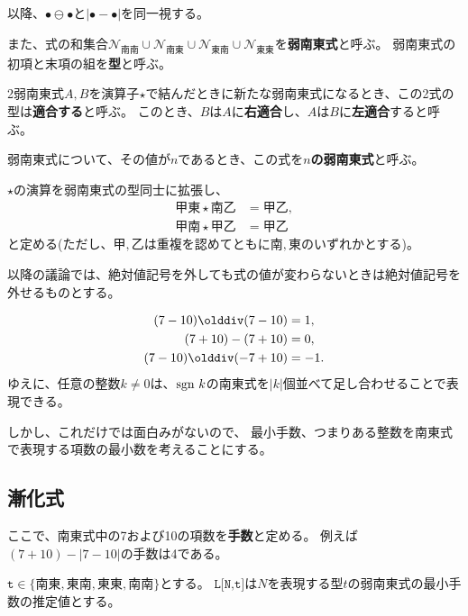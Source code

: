\documentclass[10pt,dvipdfmx]{ujarticle}
\newcommand{\nantoset}{\mathcal{N}}
\begin{document}
以降、$\bullet\ominus\bullet$と$|\bullet-\bullet|$を同一視する。

また、式の和集合$\nantoset_{南南}\cup\nantoset_{南東}\cup\nantoset_{東南}\cup\nantoset_{東東}$を\textbf{弱南東式}と呼ぶ。
弱南東式の初項と末項の組を\textbf{型}と呼ぶ。

2弱南東式$A,B$を演算子$\star$で結んだときに新たな弱南東式になるとき、この2式の型は\textbf{適合する}と呼ぶ。
このとき、$B$は$A$に\textbf{右適合}し、$A$は$B$に\textbf{左適合}すると呼ぶ。

弱南東式について、その値が$n$であるとき、この式を$n$\textbf{の弱南東式}と呼ぶ。

$\star$の演算を弱南東式の型同士に拡張し、
\begin{equation}
    \begin{aligned}
        甲東\star 南乙 & =甲乙, \\
        甲南\star 甲乙 & =甲乙
    \end{aligned}
\end{equation}
と定める(ただし、$甲,乙$は重複を認めてともに$南,東$のいずれかとする)。

以降の議論では、絶対値記号を外しても式の値が変わらないときは絶対値記号を外せるものとする。

\begin{lemma}[$1,0,-1$の南東式表現]
    \begin{subequations}
        \begin{align}
            (7-10)\olddiv(7-10)  & =1,  \\
            (7+10)-(7+10)        & =0,  \\
            (7-10)\olddiv(-7+10) & =-1.
        \end{align}
    \end{subequations}
    ゆえに、任意の整数$k\neq 0$は、${\rm sgn~}k$の南東式を$|k|$個並べて足し合わせることで表現できる。
\end{lemma}

しかし、これだけでは面白みがないので、%
最小手数、つまりある整数を南東式で表現する項数の最小数を考えることにする。

\subsection{漸化式}
ここで、南東式中の7および10の項数を\textbf{手数}と定める。
例えば$(7+10)-|7-10|$の手数は4である。

$\texttt{t}\in\{南東, 東南, 東東, 南南\}$とする。
$\texttt{L[N,t]}$は$N$を表現する型$t$の弱南東式の最小手数の推定値とする。
\end{document}
